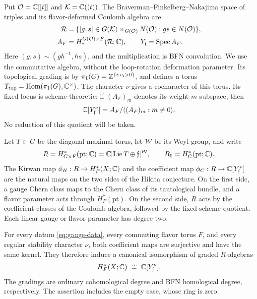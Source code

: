 Put $\mathcal O=\mathbb C[[t]]$ and $\mathcal K=\mathbb C((t))$.  The Braverman--Finkelberg--Nakajima
space of triples and its flavor-deformed Coulomb algebra are
\begin{align}
 \mathcal R&=\{[g,s]\in G(\mathcal K)\times_{G(\mathcal O)}N(\mathcal O):gs\in N(\mathcal O)\},
       \label{eq:triples-definition}\\
 A_F&=H_*^{G(\mathcal O)\times F}(\mathcal R;\mathbb C),\qquad
 Y_{\mathfrak f}=\operatorname{Spec} A_F.\label{eq:coulomb-definition}
\end{align}
Here $(g,s)\sim(gh^{-1},hs)$, and the multiplication is BFN convolution.
We use the commutative algebra, without the loop-rotation deformation
parameter.  Its topological grading is by
$\pi_1(G)=\mathbb Z^{\{i:v_i>0\}}$, and defines a torus
$T_{\mathrm{top}}=\operatorname{Hom}(\pi_1(G),\mathbb C^\times)$.
The character $\nu$ gives a cocharacter of this torus.  Its fixed locus is
scheme-theoretic: if $(A_F)_m$ denotes its weight-$m$ subspace, then
\begin{equation}\label{eq:nu-quotient}
 \mathbb C[Y_{\mathfrak f}^{\nu}]
       =A_F/\langle(A_F)_m:m\ne0\rangle.
\end{equation}
No reduction of this quotient will be taken.

Let $T\subset G$ be the diagonal maximal torus, let $\mathcal W$ be its Weyl
group, and write
\begin{equation}\label{eq:coefficient-ring}
 R=H^*_{G\times F}(\mathrm{pt};\mathbb C)
   =\mathbb C[\operatorname{Lie} T\oplus\mathfrak f]^{\mathcal W},\qquad
 R_0=H_G^*(\mathrm{pt};\mathbb C).
\end{equation}
The Kirwan map $\phi_H:R\to H_F^*(X;\mathbb C)$ and the coefficient map
$\phi_C:R\to\mathbb C[Y_{\mathfrak f}^{\nu}]$ are the natural maps on the two
sides of the Hikita conjecture.  On the first side, a gauge Chern class
maps to the Chern class of its tautological bundle, and a flavor parameter
acts through $H_F^*(\mathrm{pt})$.  On the second side, $R$ acts by the
coefficient classes of the Coulomb algebra, followed by the fixed-scheme
quotient.  Each linear gauge or flavor parameter has degree two.

\begin{theorem}\label{thm:main}
For every datum \eqref{eq:gauge-data}, every commuting flavor torus $F$, and
every regular stability character $\nu$, both coefficient maps are
surjective and have the same kernel.  They therefore induce a canonical
isomorphism of graded
$R$-algebras
\[
 H_F^*(X;\mathbb C)\ \cong\ \mathbb C[Y_{\mathfrak f}^{\nu}].
\]
The gradings are ordinary cohomological degree and BFN homological degree,
respectively.  The assertion includes the empty case, whose ring is zero.
\end{theorem}

